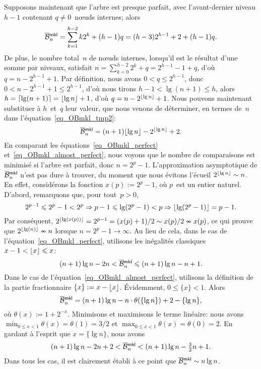 Supposons maintenant que l'arbre est presque parfait, avec
l'avant-dernier niveau \(h-1\) contenant \(q \neq 0\)~n{\oe}uds
internes; alors
\begin{equation}
\OB{\fun{mkl}}{n} = \sum_{k=1}^{h-2}k2^k + (h-1)q
= (h-3)2^{h-1} + 2 + (h-1)q.
\label{eq_OBmkl_tmp2}
\end{equation}
De plus, le nombre total~\(n\) de n{\oe}uds internes, lorsqu'il est le
résultat d'une somme par niveaux, satisfait \(n = \sum_{k=0}^{h-2}2^k
+ q = 2^{h-1} - 1 + q\), d'où \(q = n - 2^{h-1} + 1\). Par définition,
nous avons \(0 < q \leqslant 2^{h-1}\), donc \(0 < n - 2^{h-1} + 1
\leqslant 2^{h-1}\), d'où nous tirons \(h - 1 < \lg(n+1) \leqslant
h\), alors \(h = \lceil{\lg(n+1)}\rceil = \lfloor{\lg n}\rfloor + 1\), d'où \(q =
n - 2^{\lfloor{\lg n}\rfloor} + 1\). Nous pouvons maintenant substituer à
\(h\)~et~\(q\) leur valeur, que nous venons de déterminer, en termes
de~\(n\) dans l'équation~\eqref{eq_OBmkl_tmp2}:
\begin{equation}
\OB{\fun{mkl}}{n} = (n+1)\floor{\lg n} - 2^{\floor{\lg n}} + 2.
\label{eq_OBmkl_almost_perfect}
\end{equation}
En comparant les équations~\eqref{eq_OBmkl_perfect}
et~\eqref{eq_OBmkl_almost_perfect}, nous voyons que le nombre de
comparaisons est minimisé si l'arbre est parfait, donc \(n = 2^p -
1\). L'approximation asymptotique de \(\OB{\fun{mkl}}{n}\) n'est pas
dure à trouver, du moment que nous évitons l'écueil \(2^{\lfloor{\lg
    n}\rfloor} \sim n\). En effet, considérons la fonction \(x(p) := 2^p -
1\), où \(p\)~est un entier naturel. D'abord, remarquons que, pour
tout~\(p>0\),
\begin{equation*}
2^{p-1} \leqslant 2^p - 1 < 2^p \Rightarrow p-1 \leqslant \lg(2^p-1) <
p \Rightarrow \lfloor{\lg(2^p-1)}\rfloor = p-1.
\end{equation*}
Par conséquent, \(2^{\lfloor{\lg(x(p))}\rfloor} = 2^{p-1} = (x(p)+1)/2 \sim
x(p)/2 \nsim x(p)\), ce qui prouve que \(2^{\lfloor{\lg(n)}\rfloor} \nsim n\)
lorsque \(n=2^p-1 \rightarrow \infty\). Au lieu de cela, dans le cas
de l'équation~\eqref{eq_OBmkl_perfect}, utilisons les inégalités
classiques \(x - 1 < \lfloor{x}\rfloor \leqslant x\):
\begin{equation*}
(n+1)\lg n - 2n < \OB{\fun{mkl}}{n} \leqslant (n+1)\lg n - n + 1.
\end{equation*}
Dans le cas de l'équation~\eqref{eq_OBmkl_almost_perfect}, utilisons
la définition de la partie fractionnaire
\(\{x\} := x - \lfloor{x}\rfloor\). Évidemment, \(0 \leqslant \{x\} <
1\). Alors
\begin{equation*}
\OB{\fun{mkl}}{n} = (n+1)\lg n - n \cdot \theta(\{\lg n\})
                    + 2 - \{\lg n\},
\end{equation*}
où \(\theta(x) := 1 + 2^{-x}\). Minimisons et maximisons le terme
linéaire: nous avons \(\min_{0 \leqslant x < 1}\theta(x) = \theta(1) =
3/2\) et \(\max_{0 \leqslant x < 1}\theta(x) = \theta(0) =
2\). En gardant à l'esprit que \(x=\{\lg n\}\), nous avons
\begin{equation*}
(n+1)\lg n - 2n + 2 < \OB{\fun{mkl}}{n} < (n+1)\lg n - \tfrac{3}{2}n + 1.
\end{equation*}
Dans tous les cas, il est clairement établi à ce point que
\(\OB{\fun{mkl}}{n} \sim n\lg n\).


